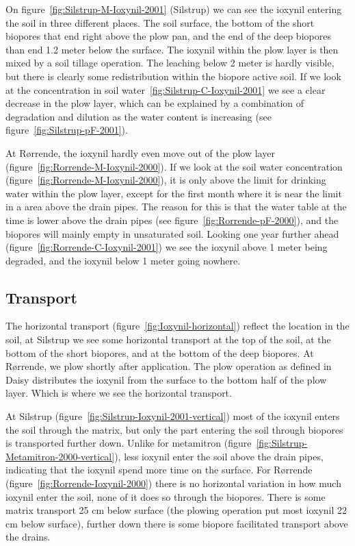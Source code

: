 On figure~\ref{fig:Silstrup-M-Ioxynil-2001} (Silstrup) we can see
the ioxynil entering the soil in three different places.  The soil
surface, the bottom of the short biopores that end right above the
plow pan, and the end of the deep biopores than end 1.2 meter below
the surface.  The ioxynil within the plow layer is then mixed by a
soil tillage operation.  The leaching below 2 meter is hardly visible,
but there is clearly some redistribution within the biopore active
soil.  If we look at the concentration in soil
water~\ref{fig:Silstrup-C-Ioxynil-2001} we see a clear decrease in
the plow layer, which can be explained by a combination of degradation
and dilution as the water content is increasing (see
figure~\ref{fig:Silstrup-pF-2001}).

At R{\o}rrende, the ioxynil hardly even move out of the plow layer
(figure~\ref{fig:Rorrende-M-Ioxynil-2000}).  If we look at the soil
water concentration (figure~\ref{fig:Rorrende-M-Ioxynil-2000}), it is
only above the limit for drinking water within the plow layer, except
for the first month where it is near the limit in a area above the
drain pipes.  The reason for this is that the water table at the time
is lower above the drain pipes (see figure~\ref{fig:Rorrende-pF-2000}),
and the biopores will mainly empty in unsaturated soil.  Looking one
year further ahead (figure~\ref{fig:Rorrende-C-Ioxynil-2001}) we see
the ioxynil above 1 meter being degraded, and the ioxynil below
1 meter going nowhere.

\subsection{Transport}

The horizontal transport (figure~\ref{fig:Ioxynil-horizontal}) reflect
the location in the soil, at Silstrup we see some horizontal transport at
the top of the soil, at the bottom of the short biopores, and at the
bottom of the deep biopores.  At R{\o}rrende, we plow shortly after
application.  The plow operation as defined in Daisy distributes the
ioxynil from the surface to the bottom half of the plow layer.
Which is where we see the horizontal transport.

At Silstrup (figure~\ref{fig:Silstrup-Ioxynil-2001-vertical}) most
of the ioxynil enters the soil through the matrix, but only the
part entering the soil through biopores is transported further down.
Unlike for metamitron
(figure~\ref{fig:Silstrup-Metamitron-2000-vertical}), less ioxynil
enter the soil above the drain pipes, indicating that the ioxynil
spend more time on the surface.  For R{\o}rrende
(figure~\ref{fig:Rorrende-Ioxynil-2000}) there is no horizontal
variation in how much ioxynil enter the soil, none of it does so
through the biopores.  There is some matrix transport 25 cm below surface
(the plowing operation put most ioxynil 22 cm below surface),
further down there is some biopore facilitated transport above the
drains.

